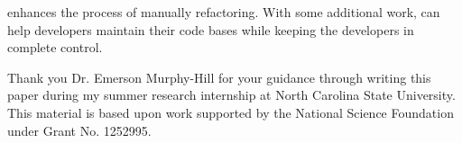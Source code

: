 \documentclass{sigplanconf}
\begin{document}
\pname{} enhances the process of manually refactoring. With some additional
work, \pname{} can help developers maintain their code bases while keeping
the developers in complete control.

\appendix
% 

\acks
Thank you Dr. Emerson Murphy-Hill for your guidance through writing this
paper during my summer research internship at North Carolina State University.
This material is based upon work supported by the National Science Foundation
under Grant No. 1252995.





\softraggedright

\end{document}

